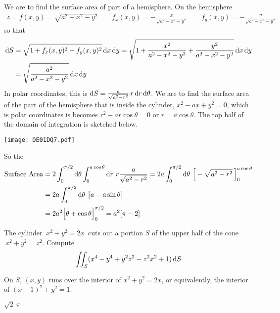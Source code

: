 \begin{solution}
We are to find the surface area of part of a hemisphere. On the hemisphere 
\begin{align*}
z=f(x,y)=\sqrt{a^2-x^2-y^2}\qquad 
f_x(x,y)=-\frac{x}{\sqrt{a^2-x^2-y^2}}\qquad
f_y(x,y)=-\frac{y}{\sqrt{a^2-x^2-y^2}}
\end{align*}
so that
\begin{align*}
\mathrm{d}S&=\sqrt{1+f_x(x,y)^2+f_y(x,y)^2}\,\mathrm{d}x\,\mathrm{d}y
=\sqrt{1+\frac{x^2}{a^2-x^2-y^2}+\frac{y^2}{a^2-x^2-y^2}}\,\mathrm{d}x\,\mathrm{d}y \\
&=\sqrt{\frac{a^2}{a^2-x^2-y^2}}\,\mathrm{d}x\,\mathrm{d}y
\end{align*}
In polar coordinates, this is $\mathrm{d}S=\frac{a}{\sqrt{a^2-r^2}}\,r\,\mathrm{d}r\,\mathrm{d}\theta$.
We are to find the surface area of the part of the hemisphere that is 
inside the cylinder, $x^2-ax+y^2=0$, which is polar coordinates is
becomes $r^2-ar\cos\theta=0$ or $r=a\cos\theta$. The top half of the domain of
integration is sketched below.  
\begin{center}
     \texttt{[image: OE01DQ7.pdf]}
\end{center}
So the
\begin{align*}
{\rm Surface\ Area}
&= 2\int_0^{\pi/2}\dee{\theta}\int_0^{a\cos\theta}\dee{r}\ r
                                      \frac{a}{\sqrt{a^2-r^2}}
= 2a\int_0^{\pi/2}\dee{\theta}\ \Big[-\sqrt{a^2-r^2}\,\Big]_0^{a\cos\theta}
\\
&= 2a\int_0^{\pi/2}\dee{\theta}\ \big[a-a\sin\theta\big] \\
&= 2a^2\Big[\theta+\cos\theta\Big]_0^{\pi/2}
=a^2[\pi-2]
\end{align*}
\end{solution}




\begin{question}
The cylinder $\ x^2+y^2=2x\ $ cuts out a portion 
$S$ of the upper half of the cone $\ x^2+y^2=z^2$. Compute
\begin{equation*}
\iint_S(x^4-y^4+y^2z^2-z^2x^2+1)\,\mathrm{d}S
\end{equation*}
\end{question}

\begin{hint} 
On $S$, $(x,y)$ runs over the interior of $x^2+y^2=2x$,
or equivalently, the interior of $(x-1)^2+y^2=1$.
\end{hint}

\begin{answer} 
$\sqrt{2}\ \pi$
\end{answer}

